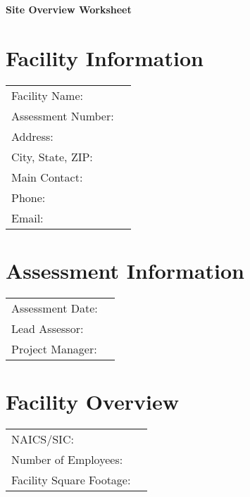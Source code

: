 \documentclass[./main.tex]{subfiles}
\begin{document}
\begin{center}
\Large\textbf{Site Overview Worksheet}
\end{center}

\section*{Facility Information}
\noindent\begin{tabularx}{\textwidth}{@{}lX@{}}
Facility Name: & \hrulefill \\[2ex]
Assessment Number: & \hrulefill \\[2ex]
Address: & \hrulefill \\[2ex]
City, State, ZIP: & \hrulefill \\[2ex]
Main Contact: & \hrulefill \\[2ex]
Phone: & \hrulefill \\[2ex]
Email: & \hrulefill \\[2ex]
\end{tabularx}

\section*{Assessment Information}
\noindent\begin{tabularx}{\textwidth}{@{}lX@{}}
Assessment Date: & \hrulefill \\[2ex]
Lead Assessor: & \hrulefill \\[2ex]
Project Manager: & \hrulefill \\[2ex]
\end{tabularx}

\section*{Facility Overview}
\noindent\begin{tabularx}{\textwidth}{@{}lX@{}}
NAICS/SIC: & \hrulefill \\[2ex]
Number of Employees: & \hrulefill \\[2ex]
Facility Square Footage: & \hrulefill \\[2ex]
\end{tabularx}

\newpage
\end{document}
